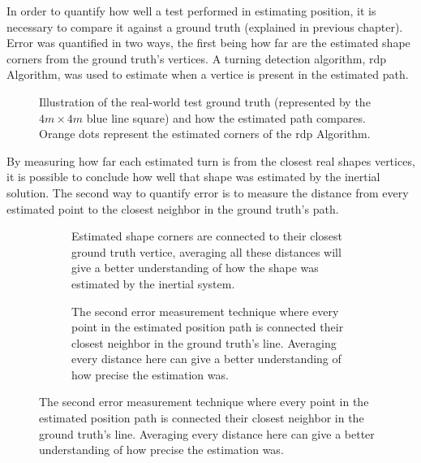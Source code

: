In order to quantify how well a test performed in estimating position, it is necessary to compare it against a ground truth (explained in previous chapter). Error was quantified in two ways, the first being how far are the estimated shape corners from the ground truth's vertices. A turning detection algorithm, \acrfull{rdp} Algorithm, was used to estimate when a vertice is present in the estimated path.

\begin{figure}[!h]
    \centering
    \resizebox{0.6\linewidth}{!}{}
    \caption{Illustration of the real-world test ground truth (represented by the $4m\times 4m$  blue line square) and how the estimated path compares. Orange dots represent the estimated corners of the \acrshort{rdp} Algorithm. }
    \label{fig:square_truth}
\end{figure}

By measuring how far each estimated turn is from the closest real shapes vertices, it is possible to conclude how well that shape was estimated by the inertial solution.
The second way to quantify error is to measure the distance from every estimated point to the closest neighbor in the ground truth's path.

\begin{figure}[!h]
    \centering
    \begin{subfigure}{0.49\textwidth}
        \centering
        \resizebox{1\linewidth}{!}{}
        \caption{Estimated shape corners are connected to their closest ground truth vertice, averaging all these distances will give a better understanding of how the shape was estimated by the inertial system.}
        \label{fig:square_turn}
    \end{subfigure}
    \begin{subfigure}{0.49\textwidth}
        \centering
        \resizebox{1\linewidth}{!}{}
        \caption{The second error measurement technique where every point in the estimated position path is connected their closest neighbor in the ground truth's line. Averaging every distance here can give a better understanding of how precise the estimation was.}
        \label{fig:square_point}
    \end{subfigure}
    \label{fig:error_methods}
\end{figure}

